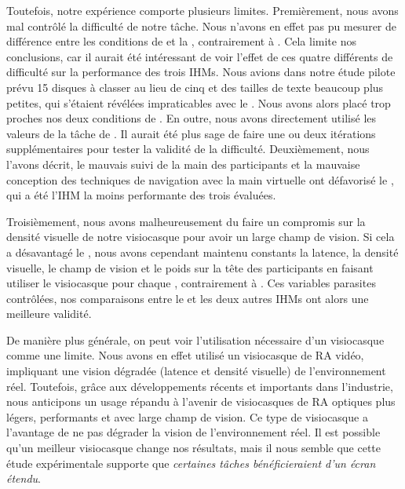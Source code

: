 Toutefois, notre expérience comporte plusieurs limites. Premièrement, nous avons mal contrôlé la difficulté de notre tâche. Nous n'avons en effet pas pu mesurer de différence entre les conditions de  et la , contrairement à \cite{Liu2014}. Cela limite nos conclusions, car il aurait été intéressant de voir l'effet de ces quatre différents  de difficulté sur la performance des trois IHMs. Nous avions dans notre étude pilote prévu 15 disques à classer au lieu de cinq et des tailles de texte beaucoup plus petites, qui s'étaient révélées impraticables avec le . Nous avons alors placé trop proches nos deux conditions de . En outre, nous avons directement utilisé les valeurs  de la tâche de \citeauthor{Liu2014}. Il aurait été plus sage de faire une ou deux itérations supplémentaires pour tester la validité de la difficulté. Deuxièmement, nous l'avons décrit, le mauvais suivi de la main des participants et la mauvaise conception des techniques de navigation avec la main virtuelle ont défavorisé le , qui a été l'IHM la moins performante des trois évaluées.

Troisièmement, nous avons malheureusement du faire un compromis sur la densité visuelle de notre visiocasque pour avoir un large champ de vision. Si cela a désavantagé le , nous avons cependant maintenu constants la latence, la densité visuelle, le champ de vision et le poids sur la tête des participants en faisant utiliser le visiocasque pour chaque , contrairement à \cite{Grubert2015}. Ces variables parasites contrôlées, nos comparaisons entre le  et les deux autres IHMs ont alors une meilleure validité.

De manière plus générale, on peut voir l'utilisation nécessaire d'un visiocasque comme une limite. Nous avons en effet utilisé un visiocasque de RA vidéo, impliquant une vision dégradée (latence et densité visuelle) de l'environnement réel. Toutefois, grâce aux développements récents et importants dans l'industrie, nous anticipons un usage répandu à l'avenir de visiocasques de RA optiques plus légers, performants et avec large champ de vision. Ce type de visiocasque a l'avantage de ne pas dégrader la vision de l'environnement réel. Il est possible qu'un meilleur visiocasque change nos résultats, mais il nous semble que cette étude expérimentale supporte que \emph{certaines tâches bénéficieraient d'un écran étendu}.


